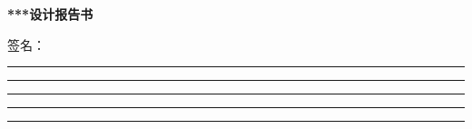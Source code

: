 \documentclass[UTF8]{ctexart}
\begin{document}
{
    \centering
    {\LARGE\textbf{***设计报告书}} \\
    {\vspace{3.5in}
    签名：
    \rule[-.4pt]{6em}{.4pt}\footnotemark[1] \qquad
    \rule[-.4pt]{6em}{.4pt}\footnotemark[2] \qquad
    \rule[-.4pt]{6em}{.4pt}\footnotemark[3] \qquad
    \rule[-.4pt]{6em}{.4pt}\footnotemark[4] \qquad
    \rule[-.4pt]{6em}{.4pt}\footnotemark[5] \qquad}\\
}

    
\clearpage
\tableofcontents
\pagebreak

\clearpage

\clearpage

\end{document}

